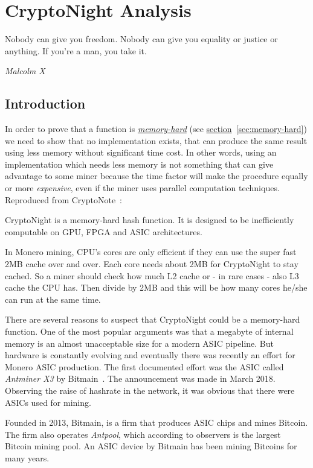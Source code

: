 \chapter{CryptoNight Analysis}
%
%
\epigraph{Nobody can give you freedom. Nobody can give you equality or justice or anything. If you're a man, you take it.}{\textit{Malcolm X}}
%
\section{Introduction}
In order to prove that a function is \hyperref[sec:memory-hard]{\emph{memory-hard}} (see \hyperref[sec:memory-hard]{section}~\ref{sec:memory-hard}) we need to show that no implementation exists, that can produce the same result using less memory without significant time cost. In other words, using an implementation which needs less memory is not something that can give advantage to some miner because the time factor will make the procedure equally or more \emph{expensive}, even if the miner uses parallel computation techniques. Reproduced from CryptoNote~\cite{cryptonight}:
\begin{quoting}
  CryptoNight is a memory-hard hash function. It is designed to be
  inefficiently computable on GPU, FPGA and ASIC architectures.
\end{quoting}

In Monero mining, CPU's cores are only efficient if they can use the super fast 2MB cache over and over. Each core needs about 2MB for CryptoNight to stay cached. So a miner should check how much L2 cache or - in rare cases - also L3 cache the CPU has. Then divide by 2MB and this will be how many cores he/she can run at the same time.

There are several reasons to suspect that CryptoNight could be a memory-hard function. One of the most popular arguments was that a megabyte of internal memory is an almost unacceptable size for a modern ASIC pipeline. But hardware is constantly evolving and eventually there was recently an effort for Monero ASIC production. The first documented effort was the ASIC called \emph{Antminer X3} by Bitmain~\cite{bitmain}. The announcement was made in March 2018. Observing the raise of hashrate in the network, it was obvious that there were ASICs used for mining.

Founded in 2013, Bitmain, is a firm that produces ASIC chips and mines Bitcoin. The firm also operates \emph{Antpool}, which according to observers is the largest Bitcoin mining pool. An ASIC device by Bitmain has been mining Bitcoins for many years.

